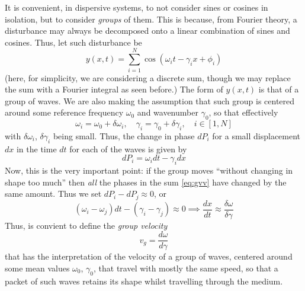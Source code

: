 \medskip \medskip 
\noindent
It is convenient, in dispersive systems, to not consider sines or cosines in isolation, but to consider \emph{groups} of them. This is because, from Fourier theory, a disturbance may always be decomposed onto a linear combination of sines and cosines. Thus, let such disturbance be
\begin{equation}\label{eq:gvv}
y(x,t) = \sum_{i=1}^N \cos(\omega_i t - \gamma_i x + \phi_i)
\end{equation}
(here, for simplicity, we are considering a discrete sum, though we may replace the sum with a Fourier integral as seen before.) The form of $y(x,t)$ is that of a group of waves. We are also making the assumption that such group is centered around some reference frequency $\omega_0$ and wavenumber $\gamma_0$, so that effectively
\begin{equation}
\omega_i = \omega_0 + \delta \omega_i, \quad \gamma_i = \gamma_0 + \delta \gamma_i, \quad i \in [1,N]
\end{equation} 
with $\delta \omega_i$,  $\delta \gamma_i$ being small. Thus, the change in phase $dP_i$ for a small displacement $dx$ in the time $dt$ for each of the waves is given by
\begin{equation}
dP_i = \omega_i dt - \gamma_i dx
\end{equation}
Now, this is the very important point: if the group moves ``without changing in shape too much'' then \emph{all} the phases in the sum \eqref{eq:gvv} have changed by the same amount. Thus we set $dP_i - dP_j \approx 0$, or
\begin{equation}
(\omega_i-\omega_j)dt - (\gamma_i-\gamma_j) \approx 0 \implies \frac{dx}{dt} \approx \frac{\delta \omega}{\delta \gamma}
\end{equation}
Thus, is convient to define the \emph{group velocity} 
\begin{equation}
v_{g} = \frac{d \omega }{d \gamma} 
\end{equation}
that has the interpretation of the velocity of a group of waves, centered around some mean values $\omega_0$, $\gamma_0$, that travel with mostly the same speed, so that a packet of such waves retains its shape whilst travelling through the medium.

